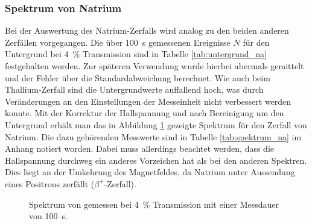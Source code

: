 \documentclass[11pt, a4paper]{article}
\numberwithin{equation}{section}
\begin{document}
\subsubsection{Spektrum von Natrium}
\begin{table}
	\centering
	
	\caption{Untergrundmessung für  mit Messdauer \SI{100}{\second} bei \SI{4}{\percent} Transmission.}
	\label{tab:untergrund_na}
\end{table}
Bei der Auswertung des Natrium-Zerfalls wird analog zu den beiden anderen Zerfällen vorgegangen.
Die über \SI{100}{\second} gemessenen Ereignisse $N$ für den Untergrund bei \SI{4}{\percent} Transmission sind in Tabelle \ref{tab:untergrund_na} festgehalten worden.
Zur späteren Verwendung wurde hierbei abermals gemittelt und der Fehler über die Standardabweichung berechnet.
Wie auch beim Thallium-Zerfall sind die Untergrundwerte auffallend hoch, was durch Veränderungen an den Einstellungen der Messeinheit nicht verbessert werden konnte.
Mit der Korrektur der Hallspannung und nach Bereinigung um den Untergrund erhält man das in Abbildung \ref{fig:natrium_spectrum} gezeigte Spektrum für den Zerfall von Natrium.
Die dazu gehörenden Messwerte sind in Tabelle \ref{tab:spektrum_na} im Anhang notiert worden.
Dabei muss allerdings beachtet werden, dass die Hallspannung durchweg ein anderes Vorzeichen hat als bei den anderen Spektren.
Dies liegt an der Umkehrung des Magnetfeldes, da Natrium unter Aussendung eines Positrons zerfällt ($\beta^+$-Zerfall).
\begin{figure}[h]
	\centering
	
	\caption{Spektrum von  gemessen bei \SI{4}{\percent} Transmission mit einer Messdauer von \SI{100}{\second}.}
	\label{fig:natrium_spectrum}
\end{figure}
\FloatBarrier
\end{document}
